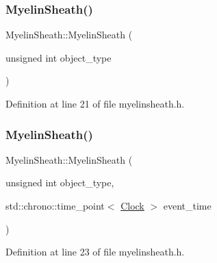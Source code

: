 \subsubsection{\texorpdfstring{Myelin\+Sheath()}{MyelinSheath()}\hspace{0.1cm}{\footnotesize\ttfamily [2/4]}}
{\footnotesize\ttfamily Myelin\+Sheath\+::\+Myelin\+Sheath (\begin{DoxyParamCaption}\item[{unsigned int}]{object\+\_\+type }\end{DoxyParamCaption})\hspace{0.3cm}{\ttfamily [inline]}}



Definition at line 21 of file myelinsheath.\+h.

\mbox{\label{class_myelin_sheath_a34a80a57ebcde58933a07ca9d99780eb}} 
\subsubsection{\texorpdfstring{Myelin\+Sheath()}{MyelinSheath()}\hspace{0.1cm}{\footnotesize\ttfamily [3/4]}}
{\footnotesize\ttfamily Myelin\+Sheath\+::\+Myelin\+Sheath (\begin{DoxyParamCaption}\item[{unsigned int}]{object\+\_\+type,  }\item[{std\+::chrono\+::time\+\_\+point$<$ \mbox{\hyperlink{universe_8h_a0ef8d951d1ca5ab3cfaf7ab4c7a6fd80}{Clock}} $>$}]{event\+\_\+time }\end{DoxyParamCaption})\hspace{0.3cm}{\ttfamily [inline]}}



Definition at line 23 of file myelinsheath.\+h.

\mbox{\label{class_myelin_sheath_aac107d8f22ca3c02f2d346f44950e6d0}} 
